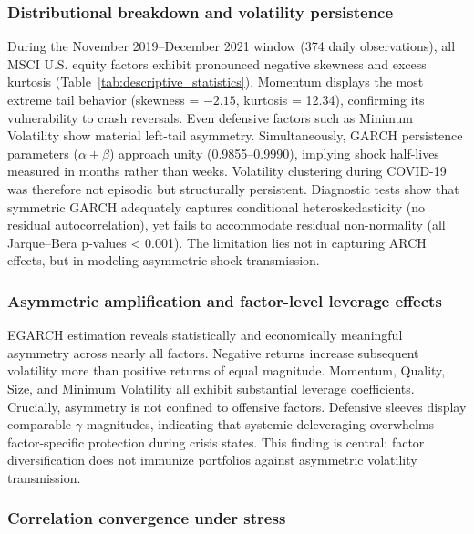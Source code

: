\documentclass{article}
\begin{document}
\subsubsection{Distributional breakdown and volatility persistence}

During the November 2019–December 2021 window (374 daily observations), all MSCI U.S. equity factors exhibit pronounced negative skewness and excess kurtosis (Table~\ref{tab:descriptive_statistics}). Momentum displays the most extreme tail behavior (skewness = $-2.15$, kurtosis = 12.34), confirming its vulnerability to crash reversals. Even defensive factors such as Minimum Volatility show material left-tail asymmetry. Simultaneously, GARCH persistence parameters ($\alpha+\beta$) approach unity (0.9855–0.9990), implying shock half-lives measured in months rather than weeks. Volatility clustering during COVID-19 was therefore not episodic but structurally persistent. Diagnostic tests show that symmetric GARCH adequately captures conditional heteroskedasticity (no residual autocorrelation), yet fails to accommodate residual non-normality (all Jarque–Bera p-values < 0.001). The limitation lies not in capturing ARCH effects, but in modeling asymmetric shock transmission.\newline

\subsubsection{Asymmetric amplification and factor-level leverage effects}

EGARCH estimation reveals statistically and economically meaningful asymmetry across nearly all factors. Negative returns increase subsequent volatility more than positive returns of equal magnitude. Momentum, Quality, Size, and Minimum Volatility all exhibit substantial leverage coefficients. Crucially, asymmetry is not confined to offensive factors. Defensive sleeves display comparable $\gamma$ magnitudes, indicating that systemic deleveraging overwhelms factor-specific protection during crisis states. This finding is central: factor diversification does not immunize portfolios against asymmetric volatility transmission.\newline

\subsubsection{Correlation convergence under stress}
\end{document}
